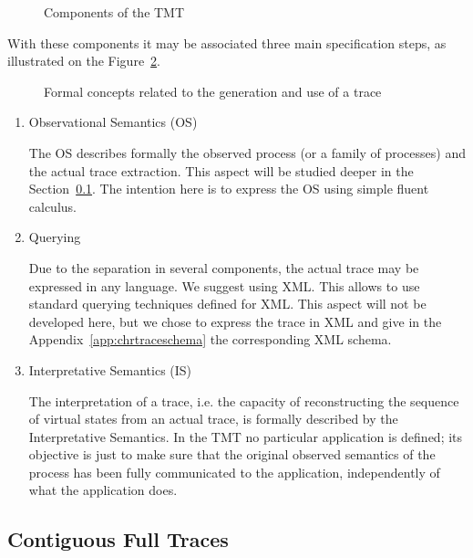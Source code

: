 \begin{figure}  \centering
{}
\caption[Components of the TMT, Composants pour la production et l'utilisation d'une trace]
{Components of the TMT}
\label{fig:componentsPD}  
\end{figure} 


\vspace{4mm}
With these components it may be associated three main specification steps, as illustrated on the Figure~\ref{fig:componentsso}.

\begin{figure} \centering
{}
\caption[Concepts formels li\'es \`a la production et l'utilisation d'une trace]
{Formal concepts related to the generation and use of a trace}
\label{fig:componentsso}  
\end{figure} 

\begin {enumerate}[-]
\item Observational Semantics (OS)

The OS describes formally the observed process (or a family of processes) and the actual trace extraction. This aspect will be studied deeper in the Section~\ref{sec:conttrace}. The intention here is to express the OS using simple fluent calculus.
\item Querying

Due to the separation in several components, the actual trace may be expressed in any language. We suggest using XML. This allows to use standard querying techniques defined for XML. This aspect will not be developed here, but we chose to express the trace in XML and give in the Appendix~\ref{app:chrtraceschema} the corresponding XML schema.
\item Interpretative Semantics (IS)

The interpretation of a trace, i.e. the capacity of reconstructing the sequence of virtual states from an actual trace, is formally described by the Interpretative Semantics. In the TMT no particular application is defined; its objective is just to make sure that the original observed semantics of the process has been fully communicated to the application, independently of what the application does.
\end{enumerate}

\subsection{Contiguous Full Traces}
\label{sec:conttrace}

